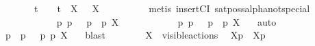 \begin{isabellebody}
\ {\isacartoucheopen}{\isasymalpha}\ {\isasymnoteq}\ {\isasymtau}\ {\isasymand}\ {\isasymalpha}\ {\isasymnoteq}\ t\ {\isasymand}\ {\isasymalpha}\ {\isasymnoteq}\ t{\isacharunderscore}{\kern0pt}{\isasymepsilon}\ {\isasymand}\ {\isacharparenleft}{\kern0pt}{\isasymforall}X{\isachardot}{\kern0pt}\ {\isasymalpha}\ {\isasymnoteq}\ {\isasymepsilon}{\isacharbrackleft}{\kern0pt}X{\isacharbrackright}{\kern0pt}{\isacharparenright}{\kern0pt}{\isacartoucheclose}\isanewline
\ \ \ \ \ \ \ \ \isamarkupfalse%
\ {\isacharparenleft}{\kern0pt}metis\ insertCI\ sat{\isacharunderscore}{\kern0pt}poss{\isacharunderscore}{\kern0pt}alpha{\isacharunderscore}{\kern0pt}not{\isacharunderscore}{\kern0pt}special{\isacharparenright}{\kern0pt}\isanewline
\ \ \ \ \isamarkupfalse%
\isanewline
\ \ \ \ \ \ \isamarkupfalse%
\ {\isacartoucheopen}{\isasymalpha}\ {\isacharequal}{\kern0pt}\ {\isasymtau}\ {\isasymand}\ {\isacharparenleft}{\kern0pt}{\isasymexists}p{\isacharprime}{\kern0pt}{\isachardot}{\kern0pt}\ p\ {\isasymlongmapsto}{\isasymtau}\ \ p{\isacharprime}{\kern0pt}\ {\isasymand}\ p{\isacharprime}{\kern0pt}\ {\isasymTTurnstile}{\isacharbrackleft}{\kern0pt}X{\isacharbrackright}{\kern0pt}\ {\isasymphi}{\isacharparenright}{\kern0pt}{\isacartoucheclose}\isanewline
\ \ \ \ \ \ \isamarkupfalse%
\ {\isacartoucheopen}{\isasymalpha}\ {\isacharequal}{\kern0pt}\ {\isasymtau}{\isacartoucheclose}\ {\isacartoucheopen}{\isasymexists}p{\isacharprime}{\kern0pt}{\isachardot}{\kern0pt}\ p\ {\isasymlongmapsto}{\isasymtau}\ \ p{\isacharprime}{\kern0pt}\ {\isasymand}\ p{\isacharprime}{\kern0pt}\ {\isasymTTurnstile}{\isacharbrackleft}{\kern0pt}X{\isacharbrackright}{\kern0pt}\ {\isasymphi}{\isacartoucheclose}\ \isamarkupfalse%
\ auto\isanewline
\ \ \ \ \ \ \isamarkupfalse%
\ \isamarkupfalse%
\ p{\isacharprime}{\kern0pt}\ \ {\isacartoucheopen}p\ {\isasymlongmapsto}{\isasymtau}\ \ p{\isacharprime}{\kern0pt}{\isacartoucheclose}\ {\isacartoucheopen}p{\isacharprime}{\kern0pt}\ {\isasymTTurnstile}{\isacharbrackleft}{\kern0pt}X{\isacharbrackright}{\kern0pt}\ {\isasymphi}{\isacartoucheclose}\ \isamarkupfalse%
\ blast\isanewline
\ \ \ \ \ \ \isamarkupfalse%
\ {\isacartoucheopen}X\ {\isasymsubseteq}\ visible{\isacharunderscore}{\kern0pt}actions{\isacartoucheclose}\ \isamarkupfalse%
\ {\isacartoucheopen}{\isasymtheta}{\isacharbrackleft}{\kern0pt}X{\isacharbrackright}{\kern0pt}{\isacharparenleft}{\kern0pt}p{\isacharparenright}{\kern0pt}\ {\isasymlongmapsto}\isactrlsup {\isasymtheta}{\isasymtau}\ {\isasymtheta}{\isacharbrackleft}{\kern0pt}X{\isacharbrackright}{\kern0pt}{\isacharparenleft}{\kern0pt}p{\isacharprime}{\kern0pt}{\isacharparenright}{\kern0pt}{\isacartoucheclose}\ \isamarkupfalse%

\end{isabellebody}
